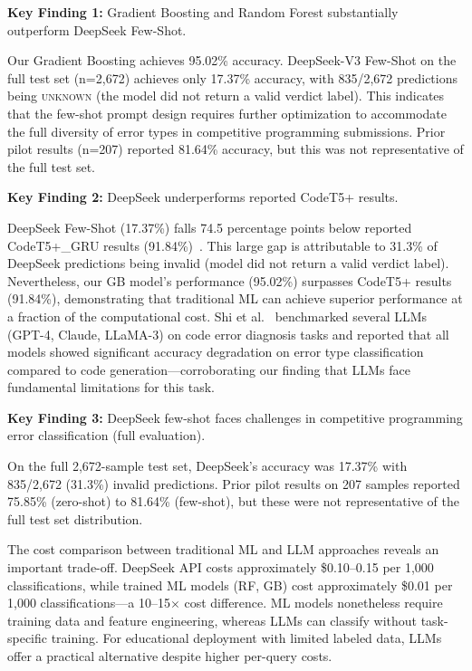 \documentclass[10pt,a4paper]{article}
\begin{document}
\textbf{Key Finding 1:} Gradient Boosting and Random Forest substantially
outperform DeepSeek Few-Shot.

Our Gradient Boosting achieves 95.02\% accuracy. DeepSeek-V3 Few-Shot on the
full test set (n=2,672) achieves only 17.37\% accuracy, with 835/2,672
predictions being \textsc{unknown} (the model did not return a valid verdict
label). This indicates that the few-shot prompt design requires further
optimization to accommodate the full diversity of error types in competitive
programming submissions. Prior pilot results (n=207) reported 81.64\% accuracy,
but this was not representative of the full test set.

\textbf{Key Finding 2:} DeepSeek underperforms reported CodeT5+ results.

DeepSeek Few-Shot (17.37\%) falls 74.5 percentage points below reported
CodeT5+\_GRU results (91.84\%)~\cite{wang2023codet5plus}. This large gap is
attributable to 31.3\% of DeepSeek predictions being invalid (model did not
return a valid verdict label). Nevertheless, our GB model's performance
(95.02\%) surpasses CodeT5+ results (91.84\%), demonstrating that traditional
ML can achieve superior performance at a fraction of the computational cost.
Shi et al.~\cite{shi2025benchmarking} benchmarked several LLMs (GPT-4, Claude,
LLaMA-3) on code error diagnosis tasks and reported that all models showed
significant accuracy degradation on error type classification compared to code
generation---corroborating our finding that LLMs face fundamental limitations
for this task.

\textbf{Key Finding 3:} DeepSeek few-shot faces challenges in competitive
programming error classification (full evaluation).

On the full 2,672-sample test set, DeepSeek's accuracy was 17.37\% with
835/2,672 (31.3\%) invalid predictions. Prior pilot results on 207 samples
reported 75.85\% (zero-shot) to 81.64\% (few-shot), but these were not
representative of the full test set distribution.

The cost comparison between traditional ML and LLM approaches reveals an
important trade-off. DeepSeek API costs approximately \$0.10--0.15 per 1,000
classifications, while trained ML models (RF, GB) cost approximately \$0.01
per 1,000 classifications---a 10--15$\times$ cost difference. ML models
nonetheless require training data and feature engineering, whereas LLMs can
classify without task-specific training. For educational deployment with
limited labeled data, LLMs offer a practical alternative despite higher
per-query costs.
\end{document}
